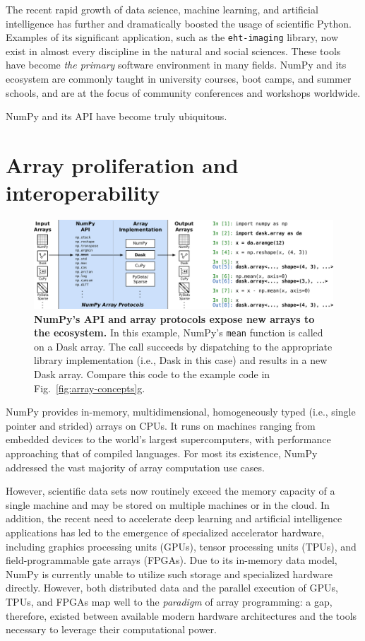 The recent rapid growth of data science, machine learning, and
artificial intelligence has further and dramatically boosted the usage of
scientific Python.  Examples of its significant application, such as the
\texttt{eht-imaging} library, now exist in almost every discipline in the natural and social
sciences.  These tools have become \emph{the primary}
software environment in many fields.  NumPy and its ecosystem are commonly
taught in university courses, boot camps, and summer schools, and are
at the focus of community conferences and workshops worldwide.

NumPy and its API have become truly ubiquitous.

\section*{Array proliferation and interoperability}

\begin{figure}
  \centering
  \includegraphics[width=\textwidth]{static/sketches/protocol}

  \caption{\textbf{NumPy's API and array protocols expose new arrays to the ecosystem.}
     In this example, NumPy's \texttt{mean} function is called on a Dask
     array.  The call succeeds by dispatching to the appropriate library implementation
     (i.e., Dask in this case) and results in a new Dask array.  Compare this
     code to the example code in Fig.~\ref{fig:array-concepts}g.
  }\label{fig:array-protocol}

\end{figure}

NumPy provides in-memory, multidimensional, homogeneously typed
(i.e., single pointer and strided) arrays on CPUs.  It runs on machines
ranging from embedded devices to the world's largest supercomputers,
with performance approaching that of compiled languages.
For most its existence, NumPy addressed the vast majority of
array computation use cases.

However, scientific data sets now routinely exceed the memory capacity of a single machine and may
be stored on multiple machines or in the cloud.
In addition, the recent need to accelerate deep learning and artificial intelligence applications
has led to the emergence of specialized accelerator hardware,
including graphics processing units (GPUs), tensor processing units (TPUs),
and field-programmable gate arrays (FPGAs).
Due to its in-memory data model, NumPy is currently unable to
utilize such storage and specialized hardware directly.  However, both
distributed data and the parallel execution of GPUs, TPUs, and FPGAs map well
to the \emph{paradigm} of array programming: a gap, therefore, existed between
available modern hardware architectures and the tools necessary to
leverage their computational power.

